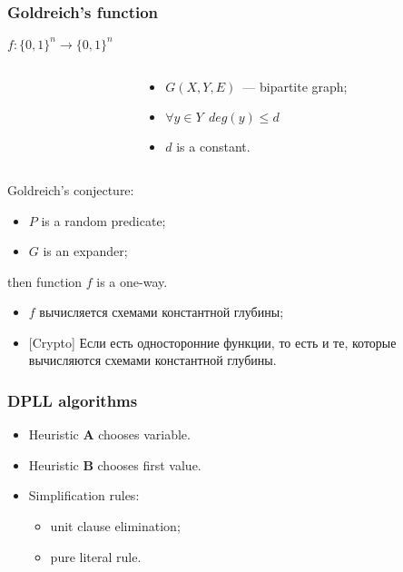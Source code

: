 \begin{frame}
	\frametitle{Goldreich's function}
	$f:\{0, 1\}^n \rightarrow \{0, 1\}^n$

    \pause

    \begin{columns}
    	\begin{column}{5.5cm}
            
        \end{column}

        \pause
        \pause
        \begin{column}{5.5cm}
            \begin{itemize}
	            \item $G(X, Y, E)$~--- bipartite graph;
            	\pause
                \item $\forall y \in Y ~~ deg(y) \le d$
            	\pause
            	\item $d$ is a constant.
            \end{itemize}
        \end{column}
	\end{columns}
    
	\pause

    Goldreich's conjecture:
    \begin{itemize}
	    \item $P$ is a random predicate;
    	\item $G$ is an expander;
    \end{itemize}
    then function $f$ is a one-way.

    \pause
    \begin{itemize}
	    \item $f$ вычисляется схемами константной глубины;
    	\pause
	    \item{} [Crypto] Если есть односторонние функции, то есть и те,
		    которые вычисляются схемами константной глубины.
    \end{itemize}
\end{frame}

\begin{frame}
	\frametitle{DPLL algorithms}

   	
    
	\pause
    \pause
    \pause
    \pause
    \pause
    \begin{itemize}
        \item Heuristic $\mathbf{A}$ chooses variable.
    	\pause
	    \item Heuristic $\mathbf{B}$ chooses first value.
    	\pause
    	\item Simplification rules:
	    \begin{itemize}
            \item unit clause elimination;
        	\item pure literal rule.
    	\end{itemize}
    \end{itemize}

\end{frame}

